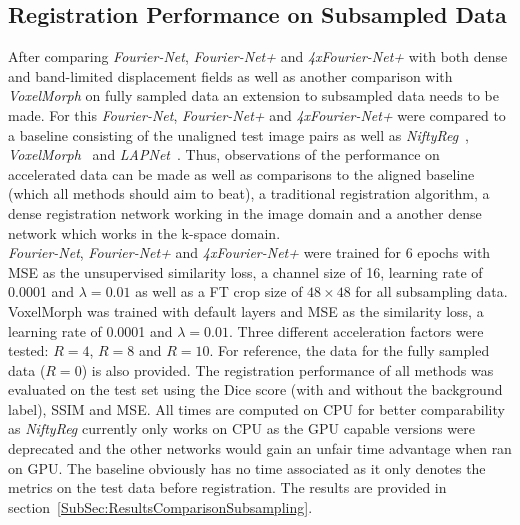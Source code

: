 \subsection{Registration Performance on Subsampled Data} \label{SubSubSec:ComparisonSubsampling}
After comparing \emph{Fourier-Net}, \emph{Fourier-Net+} and \emph{4xFourier-Net+} with both dense and band-limited displacement fields as well as another comparison with \emph{VoxelMorph} on fully sampled data an extension to subsampled data needs to be made. For this \emph{Fourier-Net}, \emph{Fourier-Net+} and \emph{4xFourier-Net+} were compared to a baseline consisting of the unaligned test image pairs as well as \emph{NiftyReg}~\cite{NiftiReg}, \emph{VoxelMorph}~\cite{Voxelmorph} and \emph{LAPNet}~\cite{LAPNet}. Thus, observations of the performance on accelerated data can be made as well as comparisons to the aligned baseline (which all methods should aim to beat), a traditional registration algorithm, a dense registration network working in the image domain and a another dense network which works in the k-space domain.\\
\emph{Fourier-Net}, \emph{Fourier-Net+} and \emph{4xFourier-Net+} were trained for 6 epochs with MSE as the unsupervised similarity loss, a channel size of 16, learning rate of 0.0001 and $\lambda=0.01$ as well as a FT crop size of $48 \times 48$ for all subsampling data. VoxelMorph was trained with default layers and MSE as the similarity loss, a learning rate of 0.0001 and $\lambda=0.01$. Three different acceleration factors were tested: $R=4$, $R=8$ and $R=10$. For reference, the data for the fully sampled data ($R=0$) is also provided. The registration performance of all methods was evaluated on the test set using the Dice score (with and without the background label), SSIM and MSE. All times are computed on CPU for better comparability as \emph{NiftyReg} currently only works on CPU as the GPU capable versions were deprecated and the other networks would gain an unfair time advantage when ran on GPU. The baseline obviously has no time associated as it only denotes the metrics on the test data before registration. The results are provided in section~\ref{SubSec:ResultsComparisonSubsampling}.


